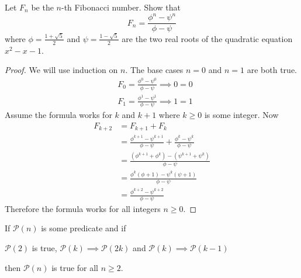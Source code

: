 \documentclass[11pt,numbers=noenddot,svgnames,dvipsnames]{scrartcl}
\begin{document}
\begin{example}
    Let $F_{n}$ be the $n$-th Fibonacci number. Show that 
    \[
        F_{n} = \frac{\phi^{n} - \psi^{n}}{\phi - \psi}
    \]
    where $\phi = \frac{1 + \sqrt{5}}{2}$ and $\psi = \frac{1 - \sqrt{5}}{2}$ are the two real roots 
    of the quadratic equation $x^{2} - x - 1$.
\end{example}
\begin{proof}
    We will use induction on $n$. The base cases $n = 0$ and $n = 1$ are both true.
    \begin{align*}
        & F_{0} = \frac{\phi^{0} - \psi^{0}}{\phi - \psi} \implies 0 = 0 \\
        & F_{1} = \frac{\phi^{1} - \psi^{1}}{\phi - \psi} \implies 1 = 1
    \end{align*}
    Assume the formula works for $k$ and $k + 1$ where $k \geq 0$ is some integer. Now 
    \begin{align*}
        F_{k + 2} & = F_{k + 1} + F_{k} \\
                  & = \frac{\phi^{k + 1} - \psi^{k + 1}}{\phi - \psi} + \frac{\phi^{k} - \psi^{k}}{\phi - \psi} \\
                  & = \frac{\left(\phi^{k + 1} + \phi^{k}\right) - \left(\psi^{k + 1} + \psi^{k}\right)}{\phi - \psi} \\
                  & = \frac{\phi^{k}\left(\phi + 1\right) - \psi^{k}(\psi + 1)}{\phi - \psi} \\
                  & = \frac{\phi^{k + 2} - \psi^{k + 2}}{\phi - \psi}
    \end{align*}
    Therefore the formula works for all integers $n \geq 0$.
\end{proof}

\begin{theorem}
    If $\mathcal{P}(n)$ is some predicate and if 
    \begin{itemize}
        \ii $\mathcal{P}(2)$ is true,
        \ii $\mathcal{P}(k) \implies \mathcal{P}(2k)$ and 
        \ii $\mathcal{P}(k) \implies \mathcal{P}(k-1)$
    \end{itemize}
    then $\mathcal{P}(n)$ is true for all $n\geq 2$.
\end{theorem}
\end{document}
